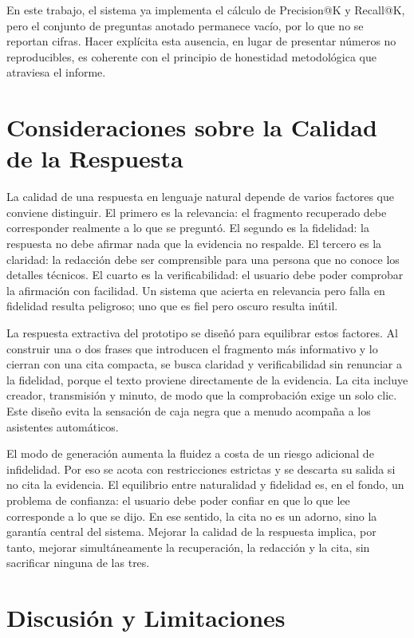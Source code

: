 \documentclass[12pt,a4paper]{article}
\begin{document}
En este trabajo, el sistema ya implementa el cálculo de Precision@K y Recall@K, pero el conjunto de preguntas anotado permanece vacío, por lo que no se reportan cifras. Hacer explícita esta ausencia, en lugar de presentar números no reproducibles, es coherente con el principio de honestidad metodológica que atraviesa el informe.



\section{Consideraciones sobre la Calidad de la Respuesta}
\label{sec:calidadresp}

La calidad de una respuesta en lenguaje natural depende de varios factores que conviene distinguir. El primero es la relevancia: el fragmento recuperado debe corresponder realmente a lo que se preguntó. El segundo es la fidelidad: la respuesta no debe afirmar nada que la evidencia no respalde. El tercero es la claridad: la redacción debe ser comprensible para una persona que no conoce los detalles técnicos. El cuarto es la verificabilidad: el usuario debe poder comprobar la afirmación con facilidad. Un sistema que acierta en relevancia pero falla en fidelidad resulta peligroso; uno que es fiel pero oscuro resulta inútil.

La respuesta extractiva del prototipo se diseñó para equilibrar estos factores. Al construir una o dos frases que introducen el fragmento más informativo y lo cierran con una cita compacta, se busca claridad y verificabilidad sin renunciar a la fidelidad, porque el texto proviene directamente de la evidencia. La cita incluye creador, transmisión y minuto, de modo que la comprobación exige un solo clic. Este diseño evita la sensación de caja negra que a menudo acompaña a los asistentes automáticos.

El modo de generación aumenta la fluidez a costa de un riesgo adicional de infidelidad. Por eso se acota con restricciones estrictas y se descarta su salida si no cita la evidencia. El equilibrio entre naturalidad y fidelidad es, en el fondo, un problema de confianza: el usuario debe poder confiar en que lo que lee corresponde a lo que se dijo. En ese sentido, la cita no es un adorno, sino la garantía central del sistema. Mejorar la calidad de la respuesta implica, por tanto, mejorar simultáneamente la recuperación, la redacción y la cita, sin sacrificar ninguna de las tres.


\section{Discusión y Limitaciones}
\label{sec:limitaciones}
\end{document}
